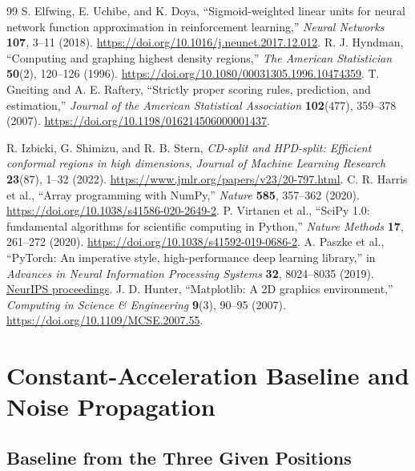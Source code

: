 \documentclass[11pt,a4paper]{article}
\begin{document}
\begin{thebibliography}{99}
 S. Elfwing, E. Uchibe, and K. Doya, ``Sigmoid-weighted linear units for neural network function approximation in reinforcement learning,'' \emph{Neural Networks} \textbf{107}, 3--11 (2018). \url{https://doi.org/10.1016/j.neunet.2017.12.012}.
 R. J. Hyndman, ``Computing and graphing highest density regions,'' \emph{The American Statistician} \textbf{50}(2), 120--126 (1996). \url{https://doi.org/10.1080/00031305.1996.10474359}.
 T. Gneiting and A. E. Raftery, ``Strictly proper scoring rules, prediction, and estimation,'' \emph{Journal of the American Statistical Association} \textbf{102}(477), 359--378 (2007). \url{https://doi.org/10.1198/016214506000001437}.

 R. Izbicki, G. Shimizu, and R. B. Stern, \emph{CD-split and HPD-split: Efficient conformal regions in high dimensions}, \emph{Journal of Machine Learning Research} \textbf{23}(87), 1--32 (2022). \url{https://www.jmlr.org/papers/v23/20-797.html}.
 C. R. Harris et al., ``Array programming with NumPy,'' \emph{Nature} \textbf{585}, 357--362 (2020). \url{https://doi.org/10.1038/s41586-020-2649-2}.
 P. Virtanen et al., ``SciPy 1.0: fundamental algorithms for scientific computing in Python,'' \emph{Nature Methods} \textbf{17}, 261--272 (2020). \url{https://doi.org/10.1038/s41592-019-0686-2}.
 A. Paszke et al., ``PyTorch: An imperative style, high-performance deep learning library,'' in \emph{Advances in Neural Information Processing Systems} \textbf{32}, 8024--8035 (2019). \href{https://proceedings.neurips.cc/paper_files/paper/2019/hash/bdbca288fee7f92f2bfa9f7012727740-Abstract.html}{NeurIPS proceedings}.
 J. D. Hunter, ``Matplotlib: A 2D graphics environment,'' \emph{Computing in Science \& Engineering} \textbf{9}(3), 90--95 (2007). \url{https://doi.org/10.1109/MCSE.2007.55}.
\end{thebibliography}

\appendix
\section{Constant-Acceleration Baseline and Noise Propagation}
\label{app:noise}

\subsection{Baseline from the Three Given Positions}
\end{document}
